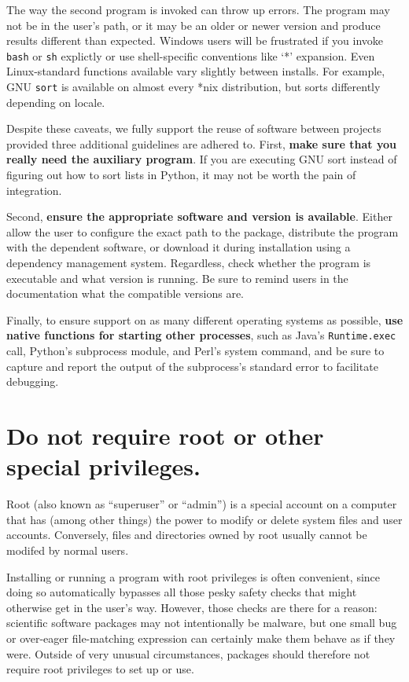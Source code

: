 \documentclass[10pt,letterpaper]{article}
\begin{document}
The way the second program is invoked can throw up errors.
The program may not be in the user's path, or it may be an
older or newer version and produce results different than expected.
Windows users will be frustrated if you invoke \texttt{bash} or \texttt{sh} explictly or
use shell-specific conventions like `*' expansion.
Even Linux-standard functions available vary slightly between
installs. For example, GNU \texttt{sort} is available on almost every
*nix distribution, but sorts differently depending on locale.

Despite these caveats,
we fully support the reuse of software between projects provided
three additional guidelines are adhered to. First, 
\textbf{make sure that you really need the auxiliary program}. If you are
executing GNU sort instead of figuring out how to sort lists in Python,
it may not be worth the pain of integration.

Second, \textbf{ensure the appropriate software and version is available}.
Either allow the user to
configure the exact path to the package, distribute the program with the
dependent software, or download it during installation using a
dependency management system. Regardless, check whether the program is
executable and what version is running. Be sure to remind users in the
documentation what the compatible versions are.

Finally, to ensure support on as many different operating systems as
possible, \textbf{use native functions for starting other processes}, such as
Java's \texttt{Runtime.exec} call, Python's subprocess module, and Perl's system
command, and be sure to capture and report the output of the subprocess's standard error
to facilitate debugging.

\section{Do not require root or other special privileges.}

Root (also known as ``superuser'' or ``admin'') is a special account on
a computer that has (among other things) the power to modify or delete
system files and user accounts. Conversely, files and directories owned
by root usually cannot be modifed by normal users.

Installing or running a program with root privileges is often
convenient, since doing so automatically bypasses all those pesky safety
checks that might otherwise get in the user's way. However, those checks
are there for a reason: scientific software packages may not
intentionally be malware, but one small bug or over-eager file-matching
expression can certainly make them behave as if they were. Outside of
very unusual circumstances, packages should therefore not require root
privileges to set up or use.
\end{document}
